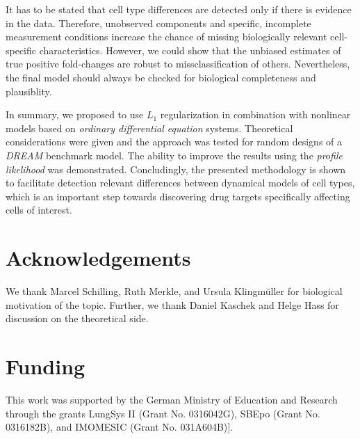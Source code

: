 \documentclass{bioinfo}
\begin{document}
It has to be stated that cell type differences are detected only if there is evidence in the data.
Therefore, unobserved components and specific, incomplete measurement conditions increase the chance of missing biologically relevant cell-specific characteristics.
However, we could show that the unbiased estimates of true positive fold-changes are robust to missclassification of others.
Nevertheless, the final model should always be checked for biological completeness and plausiblity.

In summary, we proposed to use $L_1$ regularization in combination with nonlinear models based on \emph{ordinary differential equation} systems.
Theoretical considerations were given and the approach was tested for random designs of a \emph{DREAM} benchmark model.
The ability to improve the results using the \emph{profile likelihood} was demonstrated.
Concludingly, the presented methodology is shown to facilitate detection relevant differences between dynamical models of cell types, which is an important step towards discovering drug targets specifically affecting cells of interest.

\section*{Acknowledgements}

We thank Marcel Schilling, Ruth Merkle, and Ursula Klingm{\"u}ller for biological motivation of the topic.
Further, we thank Daniel Kaschek and Helge Hass for discussion on the theoretical side.

\section*{Funding}

This work was supported by the German Ministry of Education and Research through the grants LungSys II (Grant No. 0316042G), SBEpo (Grant No. 0316182B), and IMOMESIC (Grant No. 031A604B)]. 


%
%
%
% 

% 


\end{document}
